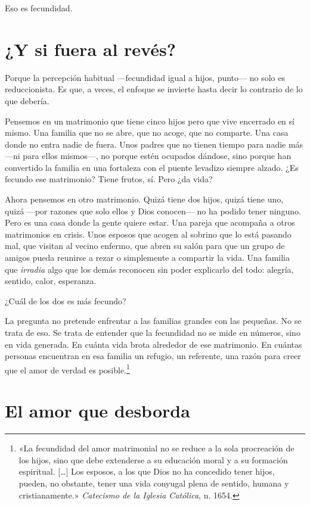 Eso es fecundidad.

\section{¿Y si fuera al revés?}

Porque la percepción habitual ---fecundidad igual a hijos, punto--- no solo es reduccionista. Es que, a veces, el enfoque se invierte hasta decir lo contrario de lo que debería.

Pensemos en un matrimonio que tiene cinco hijos pero que vive encerrado en sí mismo. Una familia que no se abre, que no acoge, que no comparte. Una casa donde no entra nadie de fuera. Unos padres que no tienen tiempo para nadie más ---ni para ellos mismos---, no porque estén ocupados dándose, sino porque han convertido la familia en una fortaleza con el puente levadizo siempre alzado. ¿Es fecundo ese matrimonio? Tiene frutos, sí. Pero ¿da vida?

Ahora pensemos en otro matrimonio. Quizá tiene dos hijos, quizá tiene uno, quizá ---por razones que solo ellos y Dios conocen--- no ha podido tener ninguno. Pero es una casa donde la gente quiere estar. Una pareja que acompaña a otros matrimonios en crisis. Unos esposos que acogen al sobrino que lo está pasando mal, que visitan al vecino enfermo, que abren su salón para que un grupo de amigos pueda reunirse a rezar o simplemente a compartir la vida. Una familia que \emph{irradia} algo que los demás reconocen sin poder explicarlo del todo: alegría, sentido, calor, esperanza.

¿Cuál de los dos es más fecundo?

La pregunta no pretende enfrentar a las familias grandes con las pequeñas. No se trata de eso. Se trata de entender que la fecundidad no se mide en números, sino en vida generada. En cuánta vida brota alrededor de ese matrimonio. En cuántas personas encuentran en esa familia un refugio, un referente, una razón para creer que el amor de verdad es posible.\footnote{«La fecundidad del amor matrimonial no se reduce a la sola procreación de los hijos, sino que debe extenderse a su educación moral y a su formación espiritual. [\ldots] Los esposos, a los que Dios no ha concedido tener hijos, pueden, no obstante, tener una vida conyugal plena de sentido, humana y cristianamente.» \textit{Catecismo de la Iglesia Católica}, n. 1654.}

\section{El amor que desborda}

